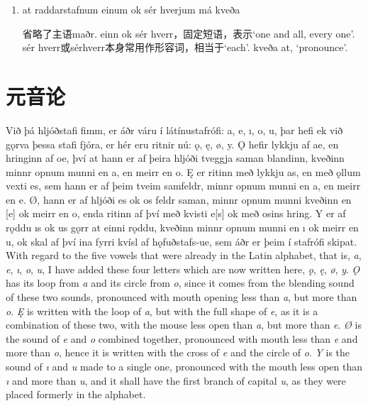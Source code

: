 \begin{grammar*}{}
    \begin{enumerate}[leftmargin=*]
        \item at raddarstafnum einum ok sér hverjum má kveða

              省略了主语maðr. einn ok sér hverr，固定短语，表示`one and all, every one'. sér hverr或sérhverr本身常用作形容词，相当于`each'. kveða at, `pronounce'.
    \end{enumerate}
\end{grammar*}
\section{元音论}
\begin{paracol}{2}
    Við þá hljóðstafi fimm, er áðr váru í látínustafrófi: a, e, ı, o, u, þar hefi ek við gǫrva þessa stafi fjóra, er hér eru ritnir nú: ǫ, ę, ø, y. Ǫ hefir lykkju af ae, en hringinn af oe, því at hann er af þeira hljóði tveggja saman blandinn, kveðinn minnr opnum munni en a, en meirr en o. Ę er ritinn með lykkju as, en með ǫllum vexti es, sem hann er af þeim tveim samfeldr, minnr opnum munni en a, en meirr en e. Ø, hann er af hljóði es ok os feldr saman, minnr opnum munni kveðinn en [e] ok meirr en o, enda ritinn af því með kvisti e[s] ok með osins hring. Y er af rǫddu ıs ok us gǫrr at einni rǫddu, kveðinn minnr opnum munni en ı ok meirr en u, ok skal af því ina fyrri kvísl af hǫfuðstafs-ue, sem áðr er þeim í stafrófi skipat.
    \switchcolumn
    With regard to the five vowels that were already in the Latin alphabet, that is, \textit{a}, \textit{e}, \textit{ı}, \textit{o}, \textit{u}, I have added these four letters which are now written here, \textit{ǫ}, \textit{ę}, \textit{ø}, \textit{y}. \textit{Ǫ} has its loop from \textit{a} and its circle from \textit{o}, since it comes from the blending sound of these two sounds, pronounced with mouth opening less than \textit{a}, but more than \textit{o}. \textit{Ę} is written with the loop of \textit{a}, but with the full shape of \textit{e}, as it is a combination of these two, with the mouse less open than \textit{a}, but more than \textit{e}. \textit{Ø} is the sound of \textit{e} and \textit{o} combined together, pronounced with mouth less than \textit{e} and more than \textit{o}, hence it is written with the cross of \textit{e} and the circle of \textit{o}. \textit{Y} is the sound of \textit{ı} and \textit{u} made to a single one, pronounced with the mouth less open than \textit{ı} and more than \textit{u}, and it shall have the first branch of capital \textit{u}, as they were placed formerly in the alphabet.
\end{paracol}
